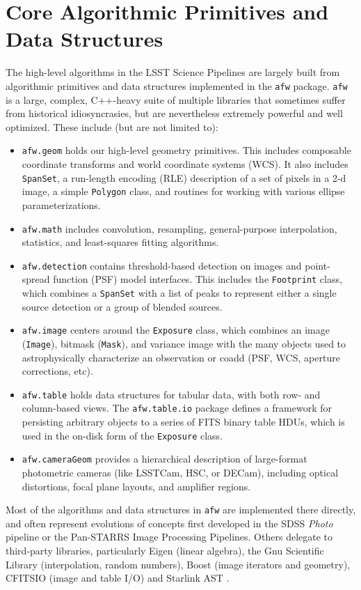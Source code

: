 \section{Core Algorithmic Primitives and Data Structures}
\label{sec:core}

The high-level algorithms in the LSST Science Pipelines are largely built from algorithmic primitives and data structures implemented in the \texttt{afw} package.
\texttt{afw} is a large, complex, C++-heavy suite of multiple libraries that sometimes suffer from historical idiosyncrasies, but are nevertheless extremely powerful and well optimized.
These include (but are not limited to):
\begin{itemize}
\item \texttt{afw.geom} holds our high-level geometry primitives.  This includes composable coordinate transforms and world coordinate systems (WCS).
    It also includes \texttt{SpanSet}, a run-length encoding (RLE) description of a set of pixels in a 2-d image, a simple \texttt{Polygon} class, and routines for working with various ellipse parameterizations.
\item \texttt{afw.math} includes convolution, resampling, general-purpose interpolation, statistics, and least-squares fitting algorithms.
\item \texttt{afw.detection} contains threshold-based detection on images and point-spread function (PSF) model interfaces.
    This includes the \texttt{Footprint} class, which combines a \texttt{SpanSet} with a list of peaks to represent either a single source detection or a group of blended sources.
\item \texttt{afw.image} centers around the \texttt{Exposure} class, which combines an image (\texttt{Image}), bitmask (\texttt{Mask}), and variance image with the many objects used to astrophysically characterize an observation or coadd (PSF, WCS, aperture corrections, etc).
\item \texttt{afw.table} holds data structures for tabular data, with both row- and column-based views.  The \texttt{afw.table.io} package defines a framework for persisting arbitrary objects to a series of FITS binary table HDUs, which is used in the on-disk form of the \texttt{Exposure} class.
\item \texttt{afw.cameraGeom} provides a hierarchical description of large-format photometric cameras (like LSSTCam, HSC, or DECam), including optical distortions, focal plane layouts, and amplifier regions.
\end{itemize}
Most of the algorithms and data structures in \texttt{afw} are implemented there directly, and often represent evolutions of concepts first developed in the SDSS \emph{Photo} pipeline or the Pan-STARRS Image Processing Pipelines.
Others delegate to third-party libraries, particularly Eigen (linear algebra), the Gnu Scientific Library (interpolation, random numbers), Boost (image iterators and geometry), CFITSIO (image and table I/O) and Starlink AST \citep[coordinate systems and transforms;][]{2016A&C....15...33B}.


